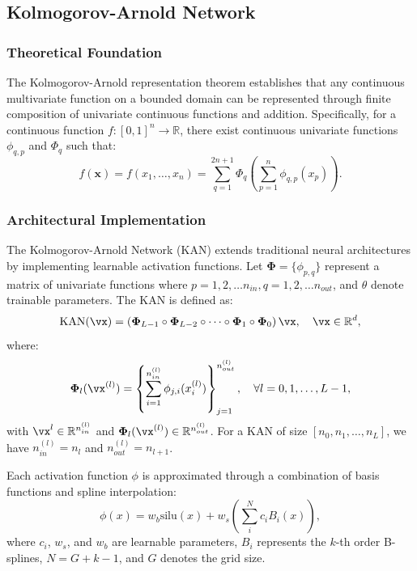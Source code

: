 \subsection{Kolmogorov-Arnold Network}\label{Appendix: networks_kan}
\subsubsection{Theoretical Foundation}
The Kolmogorov-Arnold representation theorem establishes that any continuous multivariate function on a bounded domain can be represented through finite composition of univariate continuous functions and addition. Specifically, for a continuous function $f:[0,1]^n\rightarrow \mathbb{R}$, there exist continuous univariate functions $\phi_{q,p}$ and $\Phi_{q}$ such that:
\begin{equation}
    f(\mathbf{x})=f(x_1, \dots, x_n)=\sum_{q=1}^{2n+1} \Phi_q\left(\sum_{p=1}^n \phi_{q,p}(x_p)\right).
\end{equation}

\subsubsection{Architectural Implementation}
The Kolmogorov-Arnold Network (KAN) extends traditional neural architectures by implementing learnable activation functions. Let $\mathbf{\Phi}=\{\phi_{p,q}\}$ represent a matrix of univariate functions where $p= 1, 2, \dots n_{in}, q= 1, 2, \dots n_{out}$, and $\theta$ denote trainable parameters. The KAN is defined as:
\begin{equation}
    \operatorname{KAN} (\vx) = \left(\mathbf{\Phi}_{L-1} \circ \mathbf{\Phi}_{L-2} \circ \cdots \circ \mathbf{\Phi}_1 \circ \mathbf{\Phi}_0\right) \vx, \quad \vx\in \mathbb{R}^d,
\end{equation}
where:
\begin{equation}\label{eq: def phi}
\mathbf{\Phi}_{l}(\vx^{(l)})= \left\{\sum_{i=1}^{n^{(l)}_{in}} \phi_{j,i}(x_{i}^{(l)})\right\}_{j=1}^{n^{(l)}_{out}}, \quad \forall l = 0,1,\dots,L-1,
\end{equation}
with $\vx^{l} \in \mathbb{R}^{n_{in}^{(l)}}$ and $\mathbf{\Phi}_{l}(\vx^{(l)}) \in \mathbb{R}^{n_{out}^{(l)}}$. For a KAN of size $[n_0,n_1,\dots,n_L]$, we have $n^{(l)}_{in}=n_l$ and $n^{(l)}_{out}=n_{l+1}$.

Each activation function $\phi$ is approximated through a combination of basis functions and spline interpolation:
\begin{equation}
    \phi(x)=w_b \mathrm{silu}(x)+w_s \left(\sum_i^N c_i B_i(x)\right),
\end{equation}
where $c_i$, $w_s$, and $w_b$ are learnable parameters, $B_i$ represents the $k$-th order B-splines, $N=G+k-1$, and $G$ denotes the grid size.

